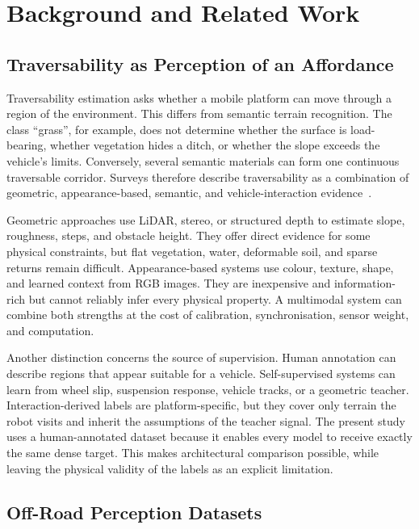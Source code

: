 \chapter{Background and Related Work}
\label{ch:background}

\section{Traversability as Perception of an Affordance}

Traversability estimation asks whether a mobile platform can move through a
region of the environment. This differs from semantic terrain recognition.
The class ``grass'', for example, does not determine whether the surface is
load-bearing, whether vegetation hides a ditch, or whether the slope exceeds
the vehicle's limits. Conversely, several semantic materials can form one
continuous traversable corridor. Surveys therefore describe traversability as
a combination of geometric, appearance-based, semantic, and
vehicle-interaction evidence~\cite{islam2022review,sevastopoulos2022survey}.

Geometric approaches use LiDAR, stereo, or structured depth to estimate slope,
roughness, steps, and obstacle height. They offer direct evidence for some
physical constraints, but flat vegetation, water, deformable soil, and sparse
returns remain difficult. Appearance-based systems use colour, texture, shape,
and learned context from RGB images. They are inexpensive and information-rich
but cannot reliably infer every physical property. A multimodal system can
combine both strengths at the cost of calibration, synchronisation, sensor
weight, and computation.

Another distinction concerns the source of supervision. Human annotation can
describe regions that appear suitable for a vehicle. Self-supervised systems
can learn from wheel slip, suspension response, vehicle tracks, or a geometric
teacher. Interaction-derived labels are platform-specific, but they cover only
terrain the robot visits and inherit the assumptions of the teacher signal.
The present study uses a human-annotated dataset because it enables every model
to receive exactly the same dense target. This makes architectural comparison
possible, while leaving the physical validity of the labels as an explicit
limitation.

\section{Off-Road Perception Datasets}

